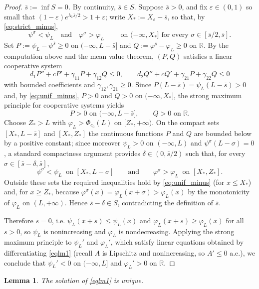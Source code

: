 \documentclass[reqno]{amsart}
\theoremstyle{plain}
\newtheorem{lemma}[theorem]{Lemma}
\theoremstyle{definition}
\theoremstyle{remark}
\begin{document}
\begin{proof}
	\emph{$\bar s:=\inf S=0$.} By continuity, $\bar s\in S$. Suppose
	$\bar s>0$, and fix $\varepsilon\in(0,1)$ so small that
	$(1-\varepsilon)e^{\lambda_1\bar s/2}>1+\varepsilon$; write
	$X_*:=X_\varepsilon-\bar s$, so that, by \eqref{eq:strict_minus},
	\begin{equation}\label{eq:unif_minus}
		\psi^{\sigma}<\psi_L \quad\text{and}\quad \varphi^{\sigma}>\varphi_L
		\qquad\text{ on } (-\infty,X_*] \text{ for every } \sigma\in[\bar s/2,\bar s].
	\end{equation}
	Set $P:=\psi_L-\psi^{\bar s}\ge0$ on $(-\infty,L-\bar s]$ and
	$Q:=\varphi^{\bar s}-\varphi_L\ge0$ on $\mathbb{R}$. By the computation above and the
	mean value theorem, $(P,Q)$ satisfies a linear cooperative system
	\[
	d_1P''+cP'+\gamma_{11}P+\gamma_{12}Q\le 0,\qquad
	d_2Q''+cQ'+\gamma_{21}P+\gamma_{22}Q\le 0
	\]
	with bounded coefficients and $\gamma_{12},\gamma_{21}\ge0$. Since
	$P(L-\bar s)=\psi_L(L-\bar s)>0$ and, by \eqref{eq:unif_minus},
	$P>0$ and $Q>0$ on $(-\infty,X_*]$, the strong maximum principle for
	cooperative systems yields
	\[
	P>0 \text{ on }(-\infty,L-\bar s],\qquad Q>0 \text{ on } \mathbb{R} .
	\]
	Choose $Z_*>L$ with $\varphi_L>\Phi_{c_0}(L)$ on $[Z_*,+\infty)$. On the
	compact sets $[X_*,L-\bar s]$ and $[X_*,Z_*]$ the continuous functions $P$
	and $Q$ are bounded below by a positive constant; since moreover
	$\psi_L>0$ on $(-\infty,L)$ and $\psi^\sigma(L-\sigma)=0$, a standard
	compactness argument provides $\delta\in(0,\bar s/2)$ such that, for every
	$\sigma\in[\bar s-\delta,\bar s]$,
	\[
	\psi^{\sigma}<\psi_L \ \text{ on }[X_*,L-\sigma]
	\qquad\text{and}\qquad
	\varphi^{\sigma}>\varphi_L \ \text{ on }[X_*,Z_*].
	\]
	Outside these sets the required inequalities hold by \eqref{eq:unif_minus}
	(for $x\le X_*$) and, for $x\ge Z_*$, because
	$\varphi^\sigma(x)=\varphi_L(x+\sigma)>\varphi_L(x)$ by the monotonicity of
	$\varphi_L$ on $(L,+\infty)$. Hence $\bar s-\delta\in S$, contradicting the
	definition of $\bar s$.

	Therefore $\bar s=0$, i.e. $\psi_L(x+s)\le\psi_L(x)$ and
	$\varphi_L(x+s)\ge\varphi_L(x)$ for all $s>0$, so $\psi_L$ is nonincreasing
	and $\varphi_L$ is nondecreasing. Applying the strong maximum principle to
	$\psi_L'$ and $\varphi_L'$, which satisfy linear equations obtained by
	differentiating \eqref{eqlm1} (recall $A$ is Lipschitz and nonincreasing, so
	$A'\le0$ a.e.), we conclude that $\psi_L'<0$ on $(-\infty,L]$ and
	$\varphi_L'>0$ on $\mathbb{R}$.
\end{proof}

\begin{lemma}\label{lm:uniq}
	The solution of \eqref{eqlm1} is unique.
\end{lemma}
\end{document}

